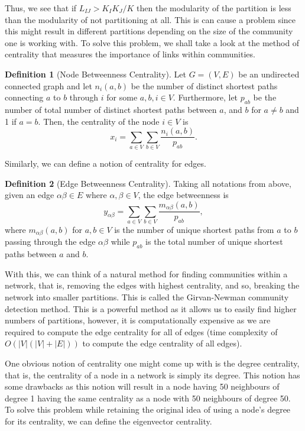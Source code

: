 \documentclass[
]{article}
\theoremstyle{definition}
\theoremstyle{definition}
\newtheorem{definition}{Definition}[section]
\begin{document}
Thus, we see that if \(L_{IJ} > K_I K_J / K\) then the modularity of the
partition is less than the modularity of not partitioning at all. This
is can cause a problem since this might result in different partitions
depending on the size of the community one is working with. To solve
this problem, we shall take a look at the method of centrality that
measures the importance of links within communities.

\begin{definition}[Node Betweenness Centrality]
  Let \(G = (V, E)\) be an undirected connected graph and let \(n_i(a, b)\) be the 
  number of distinct shortest paths connecting \(a\) to \(b\) through \(i\) for 
  some \(a, b, i \in V\). Furthermore, let \(p_{ab}\) be the number of total 
  number of distinct shortest paths between \(a\), and \(b\) for \(a \neq b\) 
  and 1 if \(a = b\). Then, the centrality of the node \(i \in V\) is 
  \[x_i = \sum_{a \in V} \sum_{b \in V} \frac{n_i(a, b)}{p_{ab}}.\]
 \end{definition}

Similarly, we can define a notion of centrality for edges.

\begin{definition}[Edge Betweenness Centrality]
  Taking all notations from above, given an edge \(\alpha\beta \in E\) where 
  \(\alpha, \beta \in V\), the edge betweenness is 
  \[y_{\alpha\beta} = \sum_{a \in V} \sum_{b \in V} \frac{m_{\alpha\beta}(a, b)}{p_{ab}},\]
  where \(m_{\alpha\beta}(a, b)\) for \(a, b \in V\) is the number of unique 
  shortest paths from \(a\) to \(b\) passing through the edge \(\alpha\beta\) while 
  \(p_{ab}\) is the total number of unique shortest paths between \(a\) and \(b\).
\end{definition}

With this, we can think of a natural method for finding communities
within a network, that is, removing the edges with highest centrality,
and so, breaking the network into smaller partitions. This is called the
Girvan-Newman community detection method. This is a powerful method as
it allows us to easily find higher numbers of partitions, however, it is
computationally expensive as we are required to compute the edge
centrality for all of edges (time complexity of
\(O(\left|V\right| (\left|V\right| + \left|E\right|))\) to compute the
edge centrality of all edges).

One obvious notion of centrality one might come up with is the degree
centrality, that is, the centrality of a node in a network is simply its
degree. This notion has some drawbacks as this notion will result in a
node having 50 neighbours of degree 1 having the same centrality as a
node with 50 neighbours of degree 50. To solve this problem while
retaining the original idea of using a node's degree for its centrality,
we can define the eigenvector centrality.
\end{document}

